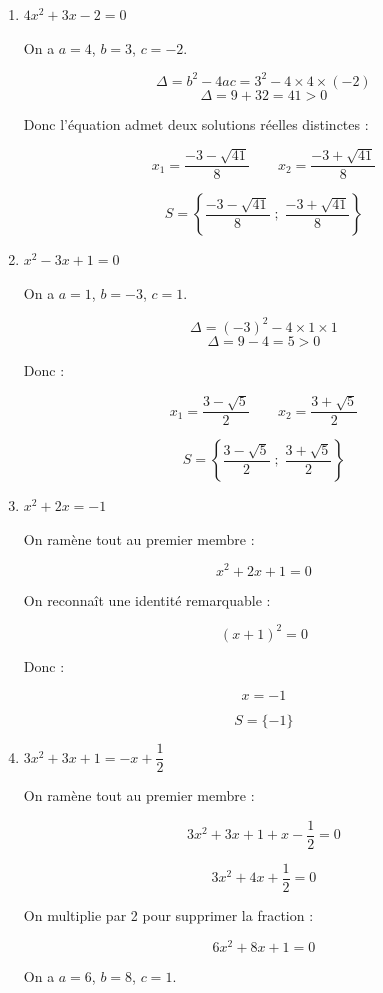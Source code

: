 \documentclass[12pt,a4paper]{article}
\newcounter{solution}
\begin{document}
\begin{enumerate}

\item $4x^2 + 3x - 2 = 0$

On a $a=4$, $b=3$, $c=-2$.

\[
\Delta = b^2 - 4ac = 3^2 - 4 \times 4 \times (-2)
\]
\[
\Delta = 9 + 32 = 41 > 0
\]

Donc l'équation admet deux solutions réelles distinctes :

\[
x_1 = \frac{-3 - \sqrt{41}}{8}
\qquad
x_2 = \frac{-3 + \sqrt{41}}{8}
\]

\[
S = \left\{ \frac{-3 - \sqrt{41}}{8} \; ; \; \frac{-3 + \sqrt{41}}{8} \right\}
\]

\item $x^2 - 3x + 1 = 0$

On a $a=1$, $b=-3$, $c=1$.

\[
\Delta = (-3)^2 - 4 \times 1 \times 1
\]
\[
\Delta = 9 - 4 = 5 > 0
\]

Donc :

\[
x_1 = \frac{3 - \sqrt{5}}{2}
\qquad
x_2 = \frac{3 + \sqrt{5}}{2}
\]

\[
S = \left\{ \frac{3 - \sqrt{5}}{2} \; ; \; \frac{3 + \sqrt{5}}{2} \right\}
\]

\item $x^2 + 2x = -1$

On ramène tout au premier membre :

\[
x^2 + 2x + 1 = 0
\]

On reconnaît une identité remarquable :

\[
(x+1)^2 = 0
\]

Donc :

\[
x = -1
\]

\[
S = \{-1\}
\]

\item $3x^2 + 3x + 1 = -x + \dfrac{1}{2}$

On ramène tout au premier membre :

\[
3x^2 + 3x + 1 + x - \frac{1}{2} = 0
\]

\[
3x^2 + 4x + \frac{1}{2} = 0
\]

On multiplie par 2 pour supprimer la fraction :

\[
6x^2 + 8x + 1 = 0
\]

On a $a=6$, $b=8$, $c=1$.


\end{enumerate}
\end{document}
